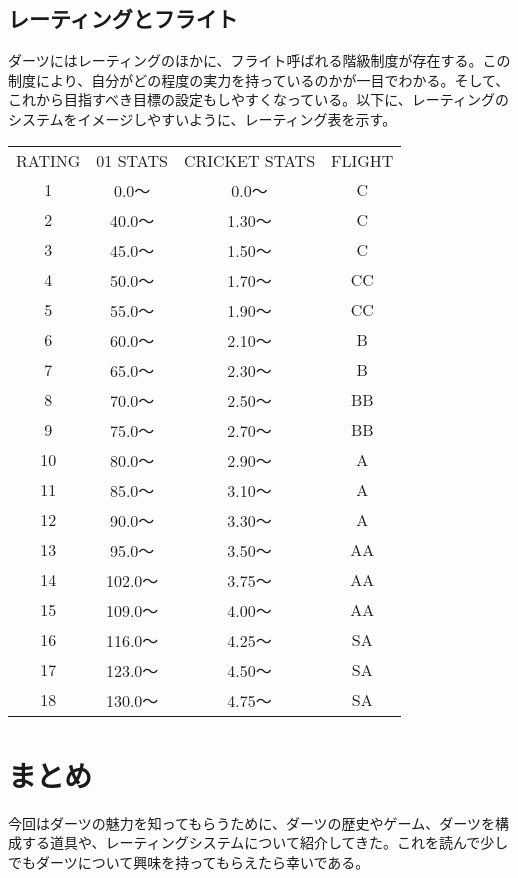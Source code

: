\documentclass{jsarticle}
\begin{document}
\subsection{レーティングとフライト}
ダーツにはレーティングのほかに、フライト呼ばれる階級制度が存在する。この制度により、自分がどの程度の実力を持っているのかが一目でわかる。そして、これから目指すべき目標の設定もしやすくなっている。以下に、レーティングのシステムをイメージしやすいように、レーティング表を示す。
\begin{table}[h]
\begin{center}
\begin{tabular}{|c|c|c|c|}
    RATING & 01 STATS & CRICKET STATS & FLIGHT \\
    1 & 0.0〜 & 0.0〜 & C \\
    2 & 40.0〜 & 1.30〜 & C \\
    3 & 45.0〜 & 1.50〜 & C \\
    4 & 50.0〜 & 1.70〜 & CC \\
    5 & 55.0〜 & 1.90〜 & CC \\
    6 & 60.0〜 & 2.10〜 & B \\
    7 & 65.0〜 & 2.30〜 & B \\
    8 & 70.0〜 & 2.50〜 & BB \\
    9 & 75.0〜 & 2.70〜 & BB \\
    10 & 80.0〜 & 2.90〜 & A \\
    11 & 85.0〜 & 3.10〜 & A \\
    12 & 90.0〜 & 3.30〜 & A \\
    13 & 95.0〜 & 3.50〜 & AA \\
    14 & 102.0〜 & 3.75〜 & AA \\
    15 & 109.0〜 & 4.00〜 & AA \\
    16 & 116.0〜 & 4.25〜 & SA \\
    17 & 123.0〜 & 4.50〜 & SA \\
    18 & 130.0〜 & 4.75〜 & SA
\end{tabular}
\end{center}
\end{table}

\section{まとめ}
今回はダーツの魅力を知ってもらうために、ダーツの歴史やゲーム、ダーツを構成する道具や、レーティングシステムについて紹介してきた。これを読んで少しでもダーツについて興味を持ってもらえたら幸いである。
\end{document}
